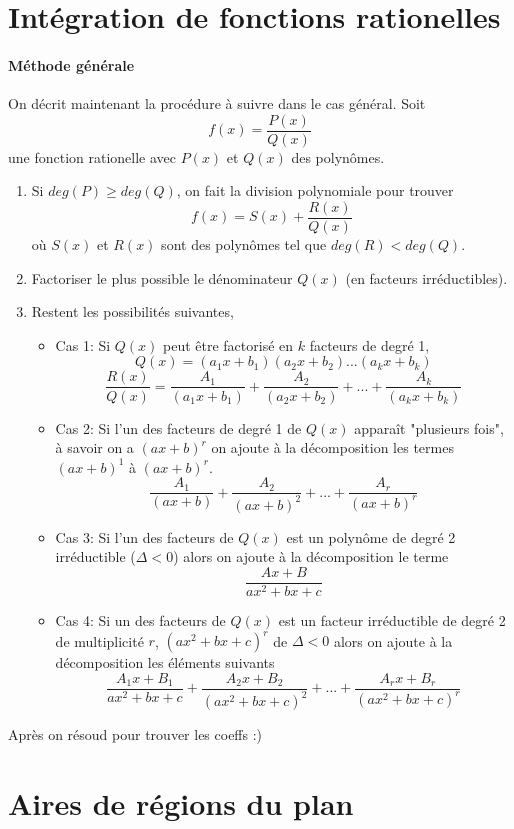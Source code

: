 \documentclass[10pt,a4paper]{book}
\begin{document}
\section{Intégration de fonctions rationelles}

\paragraph{Méthode générale} On décrit maintenant la procédure à suivre dans le cas général. Soit
\[f(x) = \frac{P(x)}{Q(x)}\]
une fonction rationelle avec $P(x)$ et $Q(x)$ des polynômes.

\begin{enumerate}
\item Si $deg(P) \geq deg(Q)$, on fait la division polynomiale pour trouver
\[f(x) = S(x) + \frac{R(x)}{Q(x)}\]
où $S(x)$ et $R(x)$ sont des polynômes tel que $deg(R) < deg(Q)$.
\item Factoriser le plus possible le dénominateur $Q(x)$ (en facteurs irréductibles).

\item Restent les possibilités suivantes,
\begin{itemize}
\item Cas 1: Si $Q(x)$ peut être factorisé en $k$ facteurs de degré 1,
\[Q(x)= (a_1x + b_1)(a_2x + b_2)...(a_kx + b_k)\]
\[\frac{R(x)}{Q(x)} = \frac{A_1}{(a_1x + b_1)}+ \frac{A_2}{(a_2x + b_2)} + ... + \frac{A_k}{(a_kx + b_k)}\]
\item Cas 2: Si l'un des facteurs de degré 1 de $Q(x)$ apparaît "plusieurs fois", à savoir on a $(ax+b)^r$ on ajoute à la décomposition les termes $(ax + b)^1$ à $(ax+b)^r$.
\[\frac{A_1}{(ax+b)} + \frac{A_2}{(ax+b)^2} + ... + \frac{A_r}{(ax+b)^r}\]
\item Cas 3: Si l'un des facteurs de $Q(x)$ est un polynôme de degré 2 irréductible ($\Delta < 0$) alors on ajoute à la décomposition le terme
\[\frac{Ax+B}{ax^2+bx+c}\]
\item Cas 4: Si un des facteurs de $Q(x)$ est un facteur irréductible de degré 2 de multiplicité $r$, $(ax^2+bx+c)^r$ de $\Delta < 0$ alors on ajoute à la décomposition les éléments suivants
\[\frac{A_1x+B_1}{ax^2+bx+c}+ \frac{A_2x+B_2}{(ax^2+bx+c)^2} + ... + \frac{A_rx+B_r}{(ax^2+bx+c)^r}\]
\end{itemize}
\end{enumerate}
Après on résoud pour trouver les coeffs :) %

\section{Aires de régions du plan}
 
\end{document}
